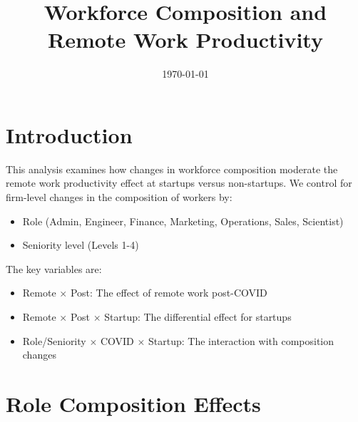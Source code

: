 \documentclass[11pt]{article}
\title{Workforce Composition and Remote Work Productivity}
\date{\today}
\begin{document}
\maketitle

\section{Introduction}

This analysis examines how changes in workforce composition moderate the remote work productivity effect at startups versus non-startups. We control for firm-level changes in the composition of workers by:
\begin{itemize}
\item Role (Admin, Engineer, Finance, Marketing, Operations, Sales, Scientist)
\item Seniority level (Levels 1-4)
\end{itemize}

The key variables are:
\begin{itemize}
\item Remote $\times$ Post: The effect of remote work post-COVID
\item Remote $\times$ Post $\times$ Startup: The differential effect for startups
\item Role/Seniority $\times$ COVID $\times$ Startup: The interaction with composition changes
\end{itemize}

\section{Role Composition Effects}
\end{document}
